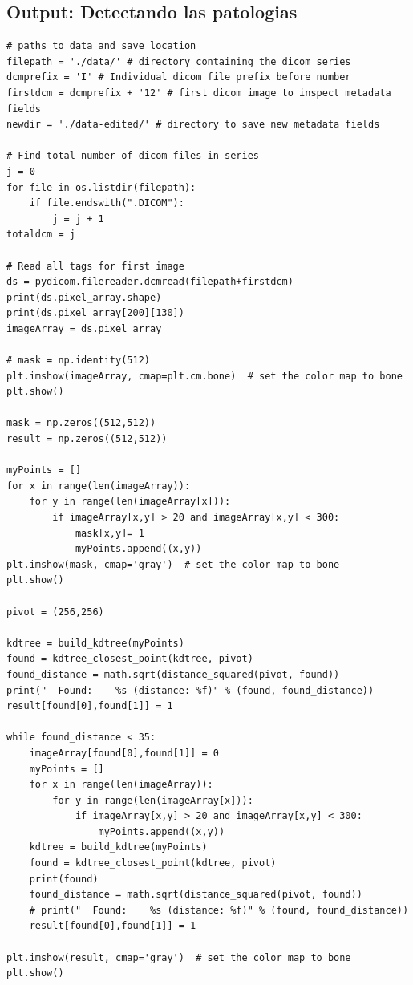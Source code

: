 \documentclass{article}
\begin{document}
\subsection{Output: Detectando las patologias}

\begin{lstlisting}[style=C]
# paths to data and save location
filepath = './data/' # directory containing the dicom series
dcmprefix = 'I' # Individual dicom file prefix before number
firstdcm = dcmprefix + '12' # first dicom image to inspect metadata fields
newdir = './data-edited/' # directory to save new metadata fields

# Find total number of dicom files in series
j = 0
for file in os.listdir(filepath):
    if file.endswith(".DICOM"):
        j = j + 1
totaldcm = j 

# Read all tags for first image
ds = pydicom.filereader.dcmread(filepath+firstdcm)
print(ds.pixel_array.shape)
print(ds.pixel_array[200][130])
imageArray = ds.pixel_array

# mask = np.identity(512)
plt.imshow(imageArray, cmap=plt.cm.bone)  # set the color map to bone
plt.show()

mask = np.zeros((512,512))
result = np.zeros((512,512))

myPoints = []
for x in range(len(imageArray)):
    for y in range(len(imageArray[x])):
        if imageArray[x,y] > 20 and imageArray[x,y] < 300:
            mask[x,y]= 1
            myPoints.append((x,y))
plt.imshow(mask, cmap='gray')  # set the color map to bone
plt.show()

pivot = (256,256)

kdtree = build_kdtree(myPoints)
found = kdtree_closest_point(kdtree, pivot)
found_distance = math.sqrt(distance_squared(pivot, found))
print("  Found:    %s (distance: %f)" % (found, found_distance))
result[found[0],found[1]] = 1

while found_distance < 35:
    imageArray[found[0],found[1]] = 0
    myPoints = []
    for x in range(len(imageArray)):
        for y in range(len(imageArray[x])):
            if imageArray[x,y] > 20 and imageArray[x,y] < 300:
                myPoints.append((x,y))
    kdtree = build_kdtree(myPoints)
    found = kdtree_closest_point(kdtree, pivot)
    print(found)
    found_distance = math.sqrt(distance_squared(pivot, found))
    # print("  Found:    %s (distance: %f)" % (found, found_distance))
    result[found[0],found[1]] = 1

plt.imshow(result, cmap='gray')  # set the color map to bone
plt.show()
\end{lstlisting}
\end{document}
